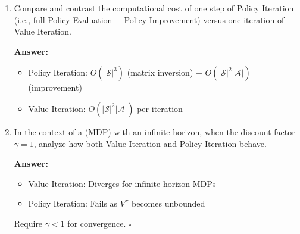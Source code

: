 \documentclass[12pt]{article}
\begin{document}
{{\begin{enumerate}[resume*]
    \textbf{Answer:}
    
    Both algorithms solve \(V = BV\), which has unique fixed point \(V^*\). Optimal policies may differ but satisfy \(V^\pi = V^*\). \hfill \(\square\)

    \item Compare and contrast the computational cost of one step of Policy Iteration (i.e., full Policy Evaluation + Policy Improvement) versus one iteration of Value Iteration.  

    \textbf{Answer:}
    
    \begin{itemize}
    \item Policy Iteration: \(O(|\mathcal{S}|^3)\) (matrix inversion) + \(O(|\mathcal{S}|^2|\mathcal{A}|)\) (improvement)
    \item Value Iteration: \(O(|\mathcal{S}|^2|\mathcal{A}|)\) per iteration
    \end{itemize}


    \item In the context of a (MDP) with an infinite horizon, when the discount factor \( \gamma = 1 \), analyze how both Value Iteration and Policy Iteration behave.

    \textbf{Answer:}
    
    \begin{itemize}
    \item Value Iteration: Diverges for infinite-horizon MDPs
    \item Policy Iteration: Fails as \(V^\pi\) becomes unbounded
    \end{itemize}
    Require \(\gamma < 1\) for convergence. \hfill \(\square\)




\end{enumerate}}}
\end{document}
